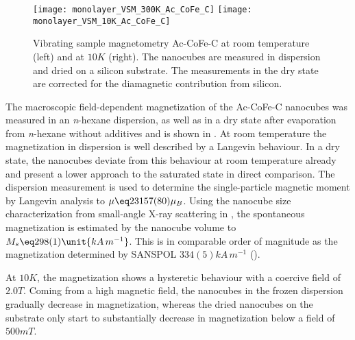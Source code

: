 \documentclass[\main/dresen_thesis.tex]{subfiles}
\begin{document}
  \label{sec:monolayers:nanoparticle:vsm}

  \begin{figure}[tb]
    \centering
    \texttt{[image: monolayer\_VSM\_300K\_Ac\_CoFe\_C]}
    \texttt{[image: monolayer\_VSM\_10K\_Ac\_CoFe\_C]}
    \caption{\label{fig:monolayers:nanoparticle:vsmAcCoFeC}Vibrating sample magnetometry Ac-CoFe-C at room temperature (left) and at $10 \unit{K}$ (right). The nanocubes are measured in dispersion and dried on a silicon substrate. The measurements in the dry state are corrected for the diamagnetic contribution from silicon.}
  \end{figure}

  The macroscopic field-dependent magnetization of the Ac-CoFe-C nanocubes was measured in an \textit{n}-hexane dispersion, as well as in a dry state after evaporation from \textit{n}-hexane without additives and is shown in .
  At room temperature the magnetization in dispersion is well described by a Langevin behaviour.
  In a dry state, the nanocubes deviate from this behaviour at room temperature already and present a lower approach to the saturated state in direct comparison.
  The dispersion measurement is used to determine the single-particle magnetic moment by Langevin analysis to $\mu \eq 23157(80) \mu_B$.
  Using the nanocube size characterization from small-angle X-ray scattering in , the spontaneous magnetization is estimated by the nanocube volume to $M_s \eq 298(1) \unit{kA\, m^{-1}}$.
  This is in comparable order of magnitude as the magnetization determined by SANSPOL $334(5) \unit{kA \, m^{-1}}$ ().

  At $10 \unit{K}$, the magnetization shows a hysteretic behaviour with a coercive field of $2.0 \unit{T}$.
  Coming from a high magnetic field, the nanocubes in the frozen dispersion gradually decrease in magnetization, whereas the dried nanocubes on the substrate only start to substantially decrease in magnetization below a field of $500 \unit{mT}$.
\end{document}
